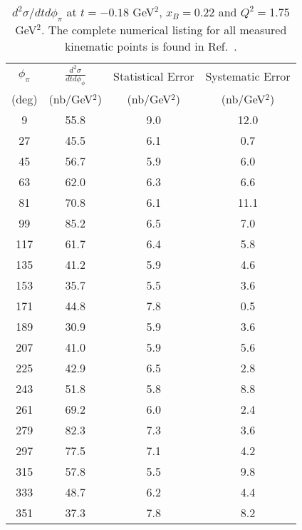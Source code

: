 \documentclass[prc,floatfix,twocolumn,superscriptaddress,letter]{revtex4}
\begin{document}
\begin{centering}
\begingroup
\squeezetable
\begin{table}[h]
\caption{$d^2\sigma/dtd\phi_\pi$ at $t=-0.18$ GeV$^2$, $x_B=0.22$ and $Q^2=$1.75 GeV$^2$. The complete numerical listing for all measured kinematic points is found in Ref.~\cite{full_table}.}
\begin{ruledtabular}
\begin{tabular}{cccc}

$\phi_\pi$  & $\frac{d^2\sigma}{dt d\phi_\phi}$   & Statistical Error & Systematic Error \\
 (deg)     &  (nb/GeV$^2$)                & (nb/GeV$^2$)       & (nb/GeV$^2$)     \\
\hline

 9   & 55.8       & 9.0 & 12.0     \\
27  & 45.5       & 6.1 & 0.7     \\
45  & 56.7     & 5.9 & 6.0     \\
63  & 62.0       & 6.3 & 6.6     \\
81  & 70.8      & 6.1 & 11.1     \\
99  & 85.2      & 6.5 & 7.0     \\
117 & 61.7      & 6.4 &  5.8  \\
135 & 41.2       & 5.9 & 4.6     \\
153 & 35.7      & 5.5 & 3.6     \\
171 & 44.8       & 7.8 & 0.5     \\
189 & 30.9        & 5.9 & 3.6     \\
207 & 41.0      & 5.9 & 5.6     \\
225 & 42.9       & 6.5 & 2.8     \\
243 & 51.8     & 5.8 & 8.8     \\
261 & 69.2       & 6.0 & 2.4     \\
279 & 82.3      & 7.3 & 3.6     \\
297 & 77.5     & 7.1 & 4.2     \\
315 & 57.8     & 5.5 & 9.8     \\
333 & 48.7    & 6.2 & 4.4     \\
351 & 37.3     & 7.8 & 8.2     \\

\end{tabular}
\end{ruledtabular}
\label{numerical-cross-sections}
\end{table}
\endgroup
\end{centering}
\end{document}
